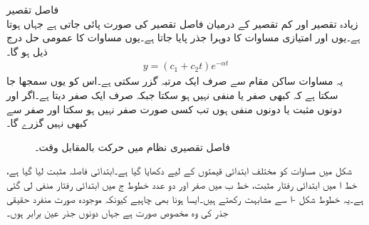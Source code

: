 \quad فاصل تقصیر\\
زیادہ تقصیر اور کم تقصیر کے درمیان فاصل تقصیر کی صورت پائی جاتی ہے جہاں  ہوتا ہے۔یوں  اور امتیازی مساوات کا دوہرا جذر  پایا جاتا ہے۔یوں مساوات  کا عمومی حل درج ذیل ہو گا۔
\begin{align}\label{مساوات_سادہ_دو_درجی_قصری_فاصل_حل_الف}
y=(c_1 +c_2 t)e^{-\alpha t}
\end{align}
یہ مساوات ساکن مقام  سے صرف ایک مرتبہ گزر سکتی ہے۔اس کو یوں سمجھا جا سکتا ہے کہ  کبھی صفر یا منفی نہیں ہو سکتا جبکہ  صرف ایک صفر دیتا ہے۔اگر  اور  دونوں مثبت یا دونوں منفی ہوں تب   کسی صورت  صفر نہیں ہو سکتا اور  صفر سے کبھی نہیں گزرے گا۔ 
\begin{figure}
\centering
{}
\caption{فاصل تقصیری نظام میں حرکت بالمقابل وقت۔}
\label{شکل_سادہ_دو_درجی_فاصل_تقصیری_حرکت_الف}
\end{figure}

شکل  میں مساوات  کو مختلف ابتدائی قیمتوں کے لیے دکھایا گیا ہے۔ابتدائی فاصلہ مثبت لیا گیا ہے، خط ا  میں ابتدائی رفتار مثبت، خط ب میں صفر اور دو عدد خطوط ج میں ابتدائی رفتار منفی لی گئی ہے۔یہ خطوط  شکل -ا سے مشابہت رکھتے ہیں۔ایسا ہونا بھی چاہیے کیونکہ موجودہ صورت منفرد حقیقی جذر کی وہ مخصوص صورت ہے جہاں دونوں جذر عین برابر ہوں۔  

